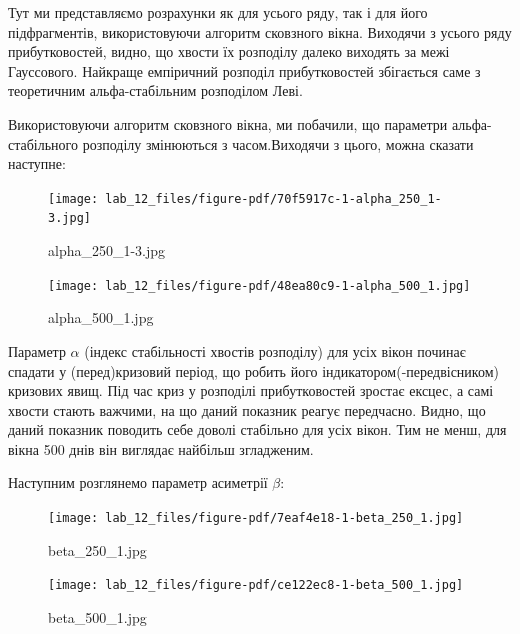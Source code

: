 \documentclass[
  letterpaper,
]{report}
\begin{document}
Тут ми представляємо розрахунки як для усього ряду, так і для його
підфрагментів, використовуючи алгоритм сковзного вікна. Виходячи з
усього ряду прибутковостей, видно, що хвости їх розподілу далеко
виходять за межі Гауссового. Найкраще емпіричний розподіл прибутковостей
збігається саме з теоретичним альфа-стабільним розподілом Леві.

Використовуючи алгоритм сковзного вікна, ми побачили, що параметри
альфа-стабільного розподілу змінюються з часом.Виходячи з цього, можна
сказати наступне:

\begin{figure}

{\centering \texttt{[image: lab\_12\_files/figure-pdf/70f5917c-1-alpha\_250\_1-3.jpg]}

}

\caption{alpha\_250\_1-3.jpg}

\end{figure}

\begin{figure}

{\centering \texttt{[image: lab\_12\_files/figure-pdf/48ea80c9-1-alpha\_500\_1.jpg]}

}

\caption{alpha\_500\_1.jpg}

\end{figure}

Параметр \(\alpha\) (індекс стабільності хвостів розподілу) для усіх
вікон починає спадати у (перед)кризовий період, що робить його
індикатором(-передвісником) кризових явищ. Під час криз у розподілі
прибутковостей зростає ексцес, а самі хвости стають важчими, на що даний
показник реагує передчасно. Видно, що даний показник поводить себе
доволі стабільно для усіх вікон. Тим не менш, для вікна 500 днів він
виглядає найбільш згладженим.

Наступним розглянемо параметр асиметрії \(\beta\):

\begin{figure}

{\centering \texttt{[image: lab\_12\_files/figure-pdf/7eaf4e18-1-beta\_250\_1.jpg]}

}

\caption{beta\_250\_1.jpg}

\end{figure}

\begin{figure}

{\centering \texttt{[image: lab\_12\_files/figure-pdf/ce122ec8-1-beta\_500\_1.jpg]}

}

\caption{beta\_500\_1.jpg}

\end{figure}
\end{document}
